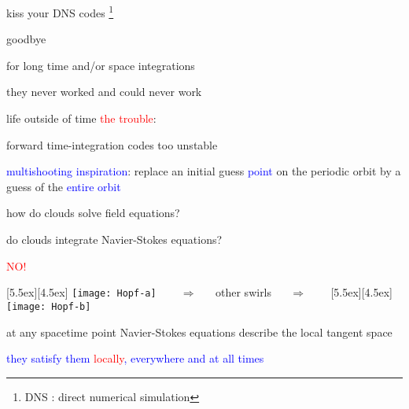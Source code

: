 \begin{frame}{kiss your DNS codes
\footnote{DNS : direct numerical simulation}
}
\begin{center}
{\huge goodbye}
\end{center}

\vfill

for long time and/or space integrations

\medskip

\hfill they never worked and could never work
\end{frame}

\begin{frame}{life outside of time}
\textcolor{red}{the trouble}:

forward time-integration codes too unstable

\bigskip
\bigskip

\textcolor{blue}{multishooting inspiration}:
 replace an initial guess \textcolor{blue}{point} on the periodic
orbit by a guess of the \textcolor{blue}{entire orbit}
\end{frame}

\begin{frame}{how do clouds solve field equations?}

do clouds integrate Navier-Stokes equations?

\begin{center}
\centerline{\textcolor{red}{\Huge NO!}}

\begin{minipage}[t]{\textwidth}
	\begin{center}
\centerline{
\raisebox{-4.0ex}[5.5ex][4.5ex]
		 {\texttt{[image: Hopf-a]}}
~~~ $\Longrightarrow$ ~~ {other swirls} ~~ $\Longrightarrow$ ~~~
	\raisebox{-4.0ex}[5.5ex][4.5ex]
		 {\texttt{[image: Hopf-b]}}
          }
	\end{center}
\end{minipage}
\end{center}

at any spacetime point Navier-Stokes equations describe the local tangent space

\bigskip

\centerline{
\textcolor{blue}{they satisfy them \textcolor{red}{\large locally}, everywhere and at all times}
}
\end{frame}

